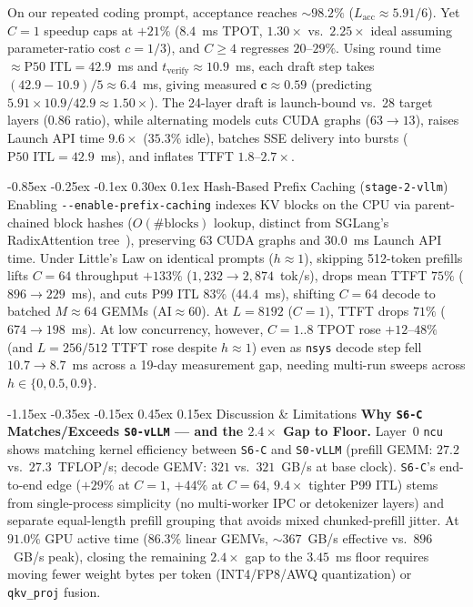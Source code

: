 \documentclass[10pt,twocolumn]{article}
\makeatletter
\renewcommand\section{\@startsection{section}{1}{\z@}%
  {-1.15ex \@plus -0.35ex \@minus -0.15ex}%
  {0.45ex \@plus 0.15ex}%
  {\normalfont\large\bfseries}}
\renewcommand\subsection{\@startsection{subsection}{2}{\z@}%
  {-0.85ex \@plus -0.25ex \@minus -0.1ex}%
  {0.30ex \@plus 0.1ex}%
  {\normalfont\normalsize\bfseries}}
\newcommand{\code}[1]{\texttt{\small #1}}
\newcommand{\stage}[1]{\texttt{\footnotesize #1}}
\makeatother
\begin{document}
On our repeated coding prompt, acceptance reaches $\sim 98.2\%$ ($L_{\text{acc}} \approx 5.91/6$). Yet $C{=}1$ speedup caps at $+21\%$ ($8.4$~ms TPOT, $1.30\times$ vs.\ $2.25\times$ ideal assuming parameter-ratio cost $c{=}1/3$), and $C \ge 4$ regresses $20$--$29\%$. Using round time $\approx \text{P50 ITL} = 42.9$~ms and $t_{\text{verify}} \approx 10.9$~ms, each draft step takes $(42.9 - 10.9)/5 \approx 6.4$~ms, giving measured $\mathbf{c \approx 0.59}$ (predicting $5.91{\times}10.9/42.9 \approx 1.50\times$). The 24-layer draft is launch-bound vs.\ 28 target layers ($0.86$ ratio), while alternating models cuts CUDA graphs ($63 \rightarrow 13$), raises Launch API time $9.6\times$ ($35.3\%$ idle), batches SSE delivery into bursts ($\text{P50 ITL} = 42.9$~ms), and inflates TTFT $1.8$--$2.7\times$.

\subsection{Hash-Based Prefix Caching (\texorpdfstring{\stage{stage-2-vllm}}{stage-2-vllm})}
Enabling \code{-{}-enable-prefix-caching} indexes KV blocks on the CPU via parent-chained block hashes ($O(\text{\#blocks})$ lookup, distinct from SGLang's RadixAttention tree~\cite{zheng2024sglang}), preserving $63$ CUDA graphs and $30.0$~ms Launch API time. Under Little's Law on identical prompts ($h \approx 1$), skipping 512-token prefills lifts $C{=}64$ throughput $+133\%$ ($1{,}232 \rightarrow 2{,}874$~tok/s), drops mean TTFT $75\%$ ($896 \rightarrow 229$~ms), and cuts P99 ITL $83\%$ ($44.4$~ms), shifting $C{=}64$ decode to batched $M{\approx}64$ GEMMs ($\text{AI} \approx 60$). At $L{=}8192$ ($C{=}1$), TTFT drops $71\%$ ($674 \rightarrow 198$~ms). At low concurrency, however, $C{=}1..8$ TPOT rose $+12$--$48\%$ (and $L{=}256/512$ TTFT rose despite $h{\approx}1$) even as \code{nsys} decode step fell $10.7 \rightarrow 8.7$~ms across a 19-day measurement gap, needing multi-run sweeps across $h \in \{0, 0.5, 0.9\}$.

\section{Discussion \& Limitations}
\textbf{Why \stage{S6-C} Matches/Exceeds \stage{S0-vLLM} --- and the $2.4\times$ Gap to Floor.}
Layer~0 \code{ncu} shows matching kernel efficiency between \stage{S6-C} and \stage{S0-vLLM} (prefill GEMM: $27.2$ vs.\ $27.3$~TFLOP/s; decode GEMV: $321$ vs.\ $321$~GB/s at base clock). \stage{S6-C}'s end-to-end edge ($+29\%$ at $C{=}1$, $+44\%$ at $C{=}64$, $9.4\times$ tighter P99 ITL) stems from single-process simplicity (no multi-worker IPC or detokenizer layers) and separate equal-length prefill grouping that avoids mixed chunked-prefill jitter. At $91.0\%$ GPU active time ($86.3\%$ linear GEMVs, $\sim 367$~GB/s effective vs.\ $896$~GB/s peak), closing the remaining $2.4\times$ gap to the $3.45$~ms floor requires moving fewer weight bytes per token (INT4/FP8/AWQ quantization) or \code{qkv\_proj} fusion.
\end{document}
